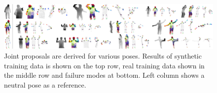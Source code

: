 \begin{figure}
	[h] \hspace{-5 mm} 
	\includegraphics[width=160mm]{figures/content/ni-pose.jpg} \caption{Joint proposals are derived for various poses. Results of synthetic training data is shown on the top row, real training data shown in the middle row and failure modes at bottom. Left column shows a neutral pose as a reference. \cite{13} } \label{fg:ni:pose} 
\end{figure}
